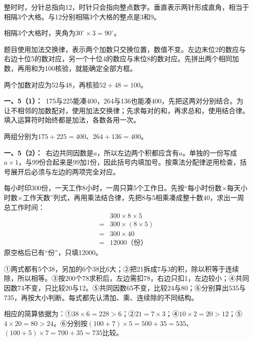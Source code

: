 \documentclass[multi=snippet,border=0pt]{standalone}
\newenvironment{snippet}[3]{\begin{minipage}{#1bp}\color{answerred}\fontsize{#2}{#3}\selectfont\raggedright}{\end{minipage}}
\begin{document}
\begin{snippet}{505}{11.5}{14}整时时，分针总指向12，时针只会指向整点数字。垂直表示两针形成直角，相当于相隔3个大格。与12分别相隔3个大格的整点是3和9。\par 相隔3个大格时，夹角为\(30^\circ\times3=90^\circ\)。\end{snippet}
\begin{snippet}{505}{11.5}{14}题目使用加法交换律，表示两个加数只交换位置，数值不变。左边末位2的数应与右边十位5的数对应，另一个十位4的数应与末位8的数对应。先拼出两个相同加数，再用和为100核验，就能确定全部方框。\par 两个加数对应为52与48，再核验\(52+48=100\)。\end{snippet}
\begin{snippet}{505}{11.5}{14}\textbf{一、5（1）：}\ 175与225能凑400，264与136也能凑400，先把这两对分别结合。为让不相邻的加数配对，使用加法交换律；先求每对的和，再求总和，使用结合律。填入运算符时始终都是加法，各数各用一次。\par 两组分别为\(175+225=400\)、\(264+136=400\)。\end{snippet}
\begin{snippet}{505}{11.5}{14}\textbf{一、5（2）：}\ 右边共同因数是\(a\)，所以左边两个积都应含有\(a\)。单独的一份写成\(a\times1\)，与99份合起来是99加1份，因此括号内填加号。按乘法分配律逆用检查，括号展开后必须与左边的两项完全对应。\end{snippet}
\begin{snippet}{505}{11.5}{14}每小时印300份，一天工作8小时，一周只算5个工作日。先按“每小时份数\(\times\)每天小时数\(\times\)工作天数”列式，再用乘法结合律，先把8与5相乘凑成整十数40，求出一周总工作时间：\[\begin{aligned}&300\times8\times5\\={}&300\times(8\times5)\\={}&300\times40\\={}&12000\text{（份）}\end{aligned}\]原空格后已有“份”，只填12000。\end{snippet}
\begin{snippet}{505}{11.5}{14}①两式都有5个38，另加的6个38比6大；②把21拆成7与3的积，除以积等于连续除，所以相等。③按200个78求积后，左边需扣78，右边只扣1，左边较小；④共同因数74不变，只比较20与12。⑤共同因数65不变，比较24与80；⑥分别算出535与735，再按大小判断。每式都先认清加、乘、连续除的不同结构。\par 相应的简算依据为：①\(38\times6=228>6\)；②\(21=7\times3\)；④\(10\times2=20>12\)；⑤\(4\times20=80>24\)。⑥分别按\((100+7)\times5=500+35=535\)、\((100+5)\times7=700+35=735\)比较。\end{snippet}
\end{document}
